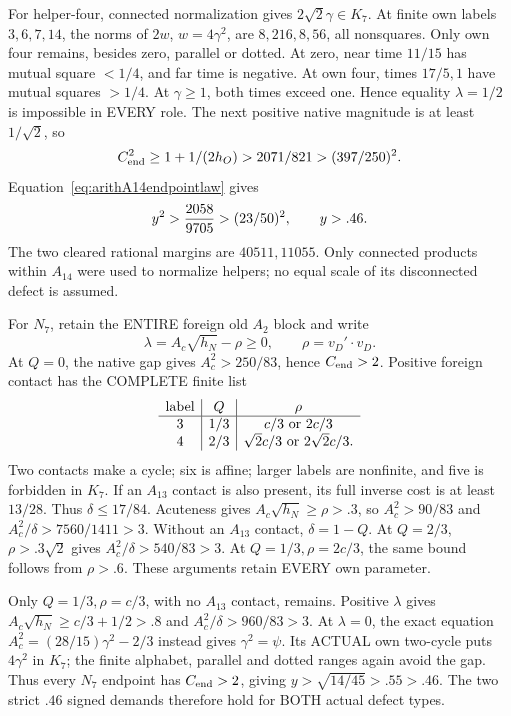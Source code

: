 For helper-four, connected normalization
gives \(2\sqrt2\gamma\in K_7\).
At finite own labels \(3,6,7,14\), the
norms of \(2w\), \(w=4\gamma^2\), are
\(8,216,8,56\), all nonsquares.
Only own four remains, besides zero,
parallel or dotted.
At zero, near time \(11/15\) has mutual
square \(<1/4\), and far time is negative.
At own four, times \(17/5,1\) have mutual
squares \(>1/4\).
At \(\gamma\ge1\), both times exceed one.
Hence equality \(\lambda=1/2\) is impossible
in EVERY role.
The next positive native magnitude is
at least \(1/\sqrt2\), so
\[
 C_{\rm end}^2\ge1+1/(2h_O)>2071/821>(397/250)^2 .
\]
Equation~\eqref{eq:arithA14endpointlaw} gives
\[
                       y^2>{2058\over9705}>(23/50)^2,\qquad y>.46 .
\]
The two cleared rational margins are
\(40511,11055\).
Only connected products within \(A_{14}\)
were used to normalize helpers; no equal
scale of its disconnected defect is assumed.

For \(N_7\), retain the ENTIRE foreign
old \(A_2\) block and write
\[
 \lambda=A_c\sqrt{h_N}-\rho\ge0,\qquad
                              \rho=v_D'\cdot v_D .
\]
At \(Q=0\), the native gap gives
\(A_c^2>250/83\), hence \(C_{\rm end}>2\).
Positive foreign contact has the COMPLETE
finite list
\[
 \begin{array}{c|c|c}
 \text{label}&Q&\rho\\ \hline
 3&1/3&c/3\ \hbox{or }2c/3\\
 4&2/3&\sqrt2c/3\ \hbox{or }2\sqrt2c/3 .
 \end{array}
\]
Two contacts make a cycle; six is affine;
larger labels are nonfinite, and five is
forbidden in \(K_7\).
If an \(A_{13}\) contact is also present,
its full inverse cost is at least \(13/28\).
Thus \(\delta\le17/84\).
Acuteness gives \(A_c\sqrt{h_N}\ge\rho>.3\),
so \(A_c^2>90/83\) and
\(A_c^2/\delta>7560/1411>3\).
Without an \(A_{13}\) contact, \(\delta=1-Q\).
At \(Q=2/3\), \(\rho>.3\sqrt2\) gives
\(A_c^2/\delta>540/83>3\).
At \(Q=1/3,\rho=2c/3\), the same bound
follows from \(\rho>.6\).
These arguments retain EVERY own parameter.

Only \(Q=1/3,\rho=c/3\), with no
\(A_{13}\) contact, remains.
Positive \(\lambda\) gives
\(A_c\sqrt{h_N}\ge c/3+1/2>.8\)
and \(A_c^2/\delta>960/83>3\).
At \(\lambda=0\), the exact equation
\(A_c^2=(28/15)\gamma^2-2/3\) instead gives
\(\gamma^2=\psi\).
Its ACTUAL own two-cycle puts
\(4\gamma^2\) in \(K_7\);
the finite alphabet, parallel and dotted
ranges again avoid the gap.
Thus every \(N_7\) endpoint has \(C_{\rm end}>2\),
giving \(y>\sqrt{14/45}>.55>.46\).
The two strict \(.46\) signed demands
therefore hold for BOTH actual defect types.

